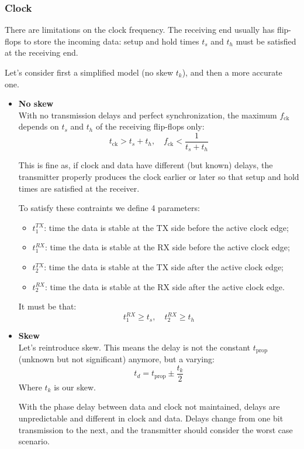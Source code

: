 \documentclass[a4paper,11pt]{article}
\begin{document}
\subsubsection{Clock}

There are limitations on the clock frequency.
The receiving end usually has flip-flops to store the incoming data: setup and hold times $t_s$ and $t_h$ must be satisfied at the receiving end.

Let's consider first a simplified model (no skew $t_k$), and then a more accurate one.

\begin{itemize}
	\item \textbf{\textsf{No skew}} \\
	      With no transmission delays and perfect synchronization,
	      the maximum $f_\text{ck}$ depends on $t_s$ and $t_h$ of the receiving flip-flops only:
	      $$
		      t_\text{ck} > t_s + t_h, \quad f_\text{ck} < \frac{1}{t_s + t_h}
	      $$

	      This is fine as, if clock and data have different (but known) delays, the transmitter properly produces the clock earlier or later so
	      that setup and hold times are satisfied at the receiver.


	      To satisfy these contraints we define 4 parameters:
	      \begin{itemize}
		      \item $t_1^{TX}$: time the data is stable at the TX side before the active clock edge;
		      \item $t_1^{RX}$: time the data is stable at the RX side before the active clock edge;
		      \item $t_2^{TX}$: time the data is stable at the TX side after the active clock edge;
		      \item $t_2^{RX}$: time the data is stable at the RX side after the active clock edge.
	      \end{itemize}

	      It must be that:
	      $$
		      t_1^{RX} \geq t_s, \quad t_2^{RX} \geq t_h
	      $$

	\item \textbf{\textsf{Skew}} \\
	      Let's reintroduce skew. This means the delay is not the constant $t_\text{prop}$ (unknown but not significant) anymore, but a varying:
	      $$
		      t_d = t_\text{prop} \pm \frac{t_k}{2}
	      $$
	      Where $t_k$ is our skew.

	      With the phase delay between data and clock not maintained, delays are unpredictable and different in clock and data.
	      Delays change from one bit transmission to the next, and the transmitter should consider the worst case scenario.


\end{itemize}
\end{document}
